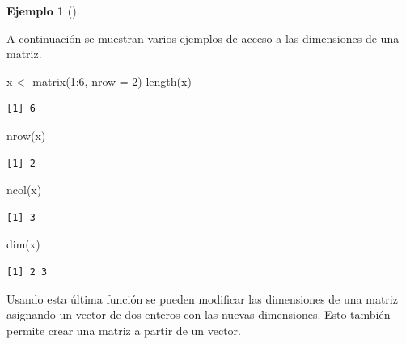 \documentclass[
  a4paper,
]{scrreport}
\newenvironment{Shaded}{\begin{snugshade}}{\end{snugshade}}
\newcommand{\AttributeTok}[1]{\textcolor[rgb]{0.40,0.45,0.13}{#1}}
\newcommand{\DecValTok}[1]{\textcolor[rgb]{0.68,0.00,0.00}{#1}}
\newcommand{\FunctionTok}[1]{\textcolor[rgb]{0.28,0.35,0.67}{#1}}
\newcommand{\NormalTok}[1]{\textcolor[rgb]{0.00,0.23,0.31}{#1}}
\newcommand{\OtherTok}[1]{\textcolor[rgb]{0.00,0.23,0.31}{#1}}
\newcommand{\SpecialCharTok}[1]{\textcolor[rgb]{0.37,0.37,0.37}{#1}}
\theoremstyle{definition}
\theoremstyle{definition}
\newtheorem{example}{Ejemplo}[chapter]
\theoremstyle{remark}
\begin{document}
\leavevmode{}%
\begin{example}[]\label{exm-dimensiones-matriz}

A continuación se muestran varios ejemplos de acceso a las dimensiones
de una matriz.

\begin{Shaded}
\begin{Highlighting}[]
\NormalTok{x }\OtherTok{\textless{}{-}} \FunctionTok{matrix}\NormalTok{(}\DecValTok{1}\SpecialCharTok{:}\DecValTok{6}\NormalTok{, }\AttributeTok{nrow =} \DecValTok{2}\NormalTok{)}
\FunctionTok{length}\NormalTok{(x)}
\end{Highlighting}
\end{Shaded}

\begin{verbatim}
[1] 6
\end{verbatim}

\begin{Shaded}
\begin{Highlighting}[]
\FunctionTok{nrow}\NormalTok{(x)}
\end{Highlighting}
\end{Shaded}

\begin{verbatim}
[1] 2
\end{verbatim}

\begin{Shaded}
\begin{Highlighting}[]
\FunctionTok{ncol}\NormalTok{(x)}
\end{Highlighting}
\end{Shaded}

\begin{verbatim}
[1] 3
\end{verbatim}

\begin{Shaded}
\begin{Highlighting}[]
\FunctionTok{dim}\NormalTok{(x)}
\end{Highlighting}
\end{Shaded}

\begin{verbatim}
[1] 2 3
\end{verbatim}

\end{example}

Usando esta última función se pueden modificar las dimensiones de una
matriz asignando un vector de dos enteros con las nuevas dimensiones.
Esto también permite crear una matriz a partir de un vector.
\end{document}
